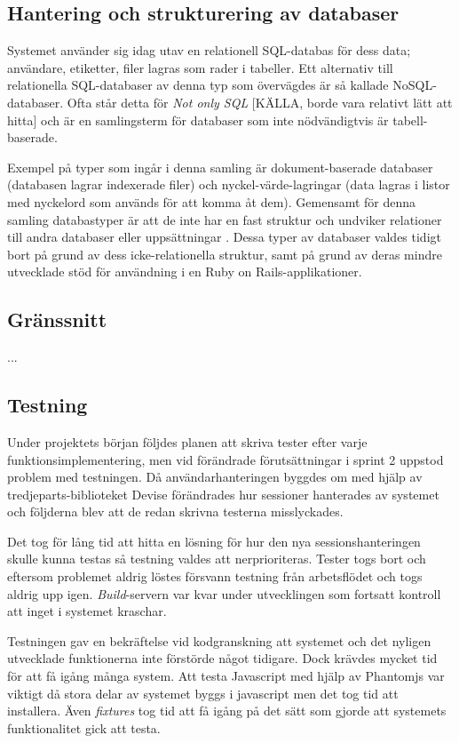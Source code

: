 \subsection{Hantering och strukturering av databaser}

Systemet använder sig idag utav en relationell SQL-databas för dess data; användare, etiketter, filer lagras som rader i tabeller. Ett alternativ till relationella SQL-databaser av denna typ som övervägdes är så kallade NoSQL-databaser. Ofta står detta för \emph{Not only SQL} [KÄLLA, borde vara relativt lätt att hitta] och är en samlingsterm för databaser som inte nödvändigtvis är tabell-baserade.

Exempel på typer som ingår i denna samling är dokument-baserade databaser (databasen lagrar indexerade filer) och nyckel-värde-lagringar (data lagras i listor med nyckelord som används för att komma åt dem). Gemensamt för denna samling databastyper är att de inte har en fast struktur och undviker relationer till andra databaser eller uppsättningar \cite{largedata}. Dessa typer av databaser valdes tidigt bort på grund av dess icke-relationella struktur, samt på grund av deras mindre utvecklade stöd för användning i en Ruby on Rails-applikationer.

\subsection{Gränssnitt}

...

\subsection{Testning}

Under projektets början följdes planen att skriva tester efter varje funktionsimplementering, men vid förändrade förutsättningar i sprint 2 uppstod problem med testningen. Då användarhanteringen byggdes om med hjälp av tredjeparts-biblioteket Devise förändrades hur sessioner hanterades av systemet och följderna blev att de redan skrivna testerna misslyckades.

Det tog för lång tid att hitta en lösning för hur den nya sessionshanteringen skulle kunna testas så testning valdes att nerprioriteras. Tester togs bort och eftersom problemet aldrig löstes försvann testning från arbetsflödet och togs aldrig upp igen. \emph{Build}-servern var kvar under utvecklingen som fortsatt kontroll att inget i systemet kraschar.

Testningen gav en bekräftelse vid kodgranskning att systemet och det nyligen utvecklade funktionerna inte förstörde något tidigare. Dock krävdes mycket tid för att få igång många system. Att testa Javascript med hjälp av Phantomjs var viktigt då stora delar av systemet byggs i javascript men det tog tid att installera. Även \emph{fixtures} tog tid att få igång på det sätt som gjorde att systemets funktionalitet gick att testa.

